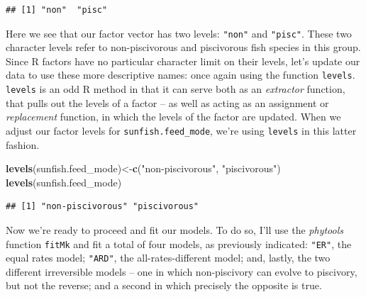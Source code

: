 \documentclass[fleqn,10pt,lineno]{wlpeerj} %
\newenvironment{Shaded}{\begin{snugshade}}{\end{snugshade}}
\newcommand{\FunctionTok}[1]{\textcolor[rgb]{0.13,0.29,0.53}{\textbf{#1}}}
\newcommand{\NormalTok}[1]{#1}
\newcommand{\OtherTok}[1]{\textcolor[rgb]{0.56,0.35,0.01}{#1}}
\newcommand{\SpecialCharTok}[1]{\textcolor[rgb]{0.81,0.36,0.00}{\textbf{#1}}}
\newcommand{\StringTok}[1]{\textcolor[rgb]{0.31,0.60,0.02}{#1}}
\begin{document}
\begin{Shaded}
\end{Shaded}

\begin{verbatim}
## [1] "non"  "pisc"
\end{verbatim}

Here we see that our factor vector has two levels: \texttt{"non"} and \texttt{"pisc"}. These two character levels refer to non-piscivorous and piscivorous fish species in this group. Since R factors have no particular character limit on their levels, let's update our data to use these more descriptive names: once again using the function \texttt{levels}. \texttt{levels} is an odd R method in that it can serve both as an \emph{extractor} function, that pulls out the levels of a factor -- as well as acting as an assignment or \emph{replacement} function, in which the levels of the factor are updated. When we adjust our factor levels for \texttt{sunfish.feed\_mode}, we're using \texttt{levels} in this latter fashion.

\begin{Shaded}
\begin{Highlighting}[]
\FunctionTok{levels}\NormalTok{(sunfish.feed\_mode)}\OtherTok{\textless{}{-}}\FunctionTok{c}\NormalTok{(}\StringTok{"non{-}piscivorous"}\NormalTok{,}
  \StringTok{"piscivorous"}\NormalTok{)}
\FunctionTok{levels}\NormalTok{(sunfish.feed\_mode)}
\end{Highlighting}
\end{Shaded}

\begin{verbatim}
## [1] "non-piscivorous" "piscivorous"
\end{verbatim}

Now we're ready to proceed and fit our models. To do so, I'll use the \emph{phytools} function \texttt{fitMk} and fit a total of four models, as previously indicated: \texttt{"ER"}, the equal rates model; \texttt{"ARD"}, the all-rates-different model; and, lastly, the two different irreversible models -- one in which non-piscivory can evolve to piscivory, but not the reverse; and a second in which precisely the opposite is true.
\end{document}
